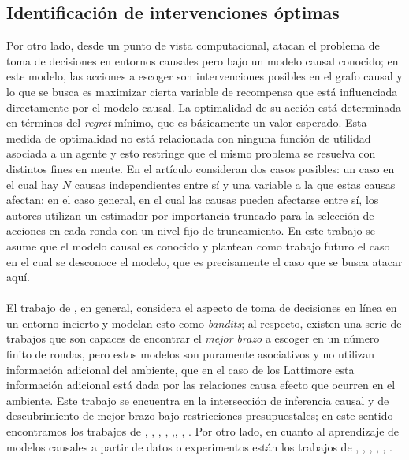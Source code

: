 \documentclass[11pt]{article}
\theoremstyle{plain}
\begin{document}
\subsection{Identificación de intervenciones óptimas}
\cite{bubeck2009pure}
\cite{gabillon2012best}
\cite{agarwal2014taming}

\indent Por otro lado, desde un punto de vista computacional, \cite{lattimoreNIPS2016} atacan el problema de toma de decisiones en entornos causales pero bajo un modelo causal conocido; en este modelo, las acciones a escoger son intervenciones posibles en el grafo causal y lo que se busca es maximizar cierta variable de recompensa que está influenciada directamente por el modelo causal. La optimalidad de su acción está determinada en términos del \textit{regret} mínimo, que es básicamente un valor esperado. Esta medida de optimalidad no está relacionada con ninguna función de utilidad asociada a un agente y esto restringe que el mismo problema se resuelva con distintos fines en mente. En el artículo consideran dos casos posibles: un caso en el cual hay $N$ causas independientes entre sí y una variable a la que estas causas afectan; en el caso general, en el cual las causas pueden afectarse entre sí, los autores utilizan un estimador por importancia truncado para la selección de acciones en cada ronda con un nivel fijo de truncamiento. En este trabajo se asume que el modelo causal es conocido y plantean como trabajo futuro el caso en el cual se desconoce el modelo, que es precisamente el caso que se busca atacar aquí.\\
\\
\indent El trabajo de \cite{lattimoreNIPS2016}, en general, considera el aspecto de toma de decisiones en línea en un entorno incierto y modelan esto como \textit{bandits}; al respecto, existen una serie de trabajos que son capaces de encontrar el \textit{mejor brazo} a escoger en un número finito de rondas, pero estos modelos son puramente asociativos y no utilizan información adicional del ambiente, que en el caso de los Lattimore esta información adicional está dada por las relaciones causa efecto que ocurren en el ambiente. Este trabajo se encuentra en la intersección de inferencia causal y de descubrimiento de mejor brazo bajo restricciones presupuestales; en este sentido encontramos los trabajos de \cite{audibert2010best}, \cite{jamieson2014lil},  \cite{jamieson2014best},  \cite{ortega2014generalized}, \cite{chen2015optimal},\cite{carpentier2016tight},  \cite{russo2016simple},  \cite{kaufmann2016complexity}. Por otro lado, en cuanto al aprendizaje de modelos causales a partir de datos o experimentos están los trabajos de \cite{eberhardt2008almost}, \cite{mooij2016distinguishing}, \cite{hyttinen2013experiment}, \cite{hauser2012two}, \cite{loh2014high}, \cite{shanmugam2015learning}.\\
\end{document}
